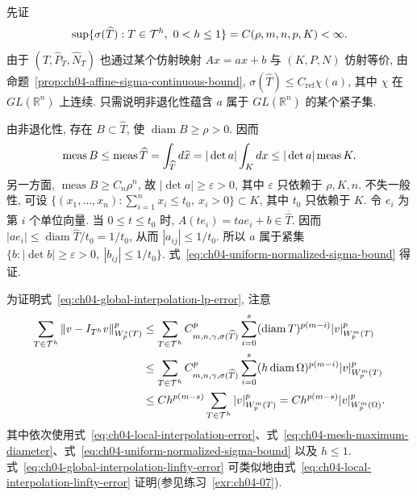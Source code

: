 \begin{Proof}
先证
\begin{equation}
\MathBookFormulaID{formula-ch04-uniform-normalized-sigma-bound}
\label{eq:ch04-uniform-normalized-sigma-bound}
\sup\{\sigma(\widehat T):T\in\mathcal T^h,\ 0<h\leq1\}
=C(\rho,m,n,p,K)<\infty.
\end{equation}
由于 $(\widehat T,\widehat P_T,\widehat N_T)$ 也通过某个仿射映射 $Ax=ax+b$ 与 $(K,P,N)$ 仿射等价, 由命题~\ref{prop:ch04-affine-sigma-continuous-bound}, $\sigma(\widehat T)\leq C_{\mathrm{ref}}\chi(a)$, 其中 $\chi$ 在 $GL(\mathbb R^n)$ 上连续. 只需说明非退化性蕴含 $a$ 属于 $GL(\mathbb R^n)$ 的某个紧子集.

由非退化性, 存在 $B\subset\widehat T$, 使 $\operatorname{diam}B\geq\rho>0$. 因而
\[
\MathBookFormulaID{formula-ch04-affine-determinant-lower-bound}
\operatorname{meas}B\leq\operatorname{meas}\widehat T
=\int_{\widehat T}d\widehat x
=|\det a|\int_Kdx
\leq|\det a|\operatorname{meas}K.
\]
另一方面, $\operatorname{meas}B\geq C_n\rho^n$, 故 $|\det a|\geq\varepsilon>0$, 其中 $\varepsilon$ 只依赖于 $\rho,K,n$. 不失一般性, 可设 $\{(x_1,\ldots,x_n):\sum_{i=1}^nx_i\leq t_0,\ x_i>0\}\subset K$, 其中 $t_0$ 只依赖于 $K$. 令 $e_i$ 为第 $i$ 个单位向量. 当 $0\leq t\leq t_0$ 时, $A(te_i)=tae_i+b\in\overline{\widehat T}$. 因而 $|ae_i|\leq\operatorname{diam}\widehat T/t_0=1/t_0$, 从而 $|a_{ij}|\leq1/t_0$. 所以 $a$ 属于紧集 $\{b:|\det b|\geq\varepsilon>0,\ |b_{ij}|\leq1/t_0\}$. 式~\eqref{eq:ch04-uniform-normalized-sigma-bound} 得证.

为证明式~\eqref{eq:ch04-global-interpolation-lp-error}, 注意
\[
\MathBookFormulaID{formula-ch04-global-interpolation-lp-proof}
\begin{aligned}
\sum_{T\in\mathcal T^h}\|v-I_{T^h}v\|_{W_p^s(T)}^p
&\leq\sum_{T\in\mathcal T^h}C_{m,n,\gamma,\sigma(\widehat T)}^p
\sum_{i=0}^s(\operatorname{diam}T)^{p(m-i)}|v|_{W_p^m(T)}^p\\
&\leq\sum_{T\in\mathcal T^h}C_{m,n,\gamma,\sigma(\widehat T)}^p
\sum_{i=0}^s(h\operatorname{diam}\Omega)^{p(m-i)}|v|_{W_p^m(T)}^p\\
&\leq Ch^{p(m-s)}\sum_{T\in\mathcal T^h}|v|_{W_p^m(T)}^p
=Ch^{p(m-s)}|v|_{W_p^m(\Omega)}^p.
\end{aligned}
\]
其中依次使用式~\eqref{eq:ch04-local-interpolation-error}、式~\eqref{eq:ch04-mesh-maximum-diameter}、式~\eqref{eq:ch04-uniform-normalized-sigma-bound} 以及 $h\leq1$. 式~\eqref{eq:ch04-global-interpolation-linfty-error} 可类似地由式~\eqref{eq:ch04-local-interpolation-linfty-error} 证明(参见练习~\ref{exr:ch04-07}).
\end{Proof}

